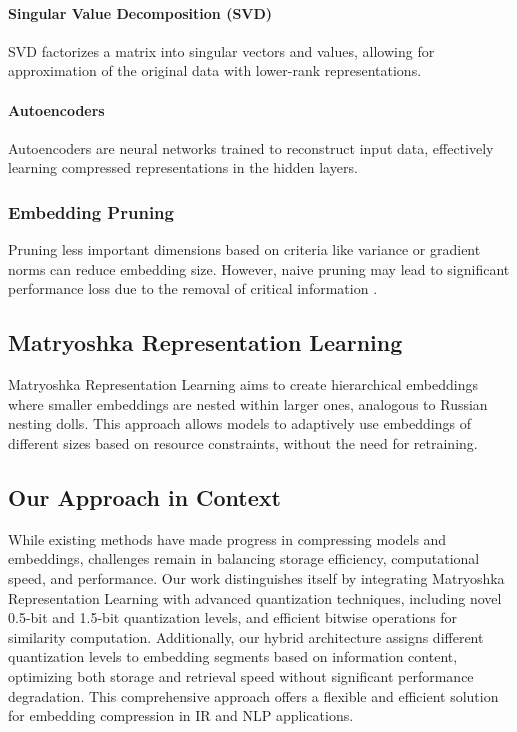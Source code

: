 \paragraph{Singular Value Decomposition (SVD)}  
  
SVD \cite{golub1971singular} factorizes a matrix into singular vectors and values, allowing for approximation of the original data with lower-rank representations.  
  
\paragraph{Autoencoders}  
  
Autoencoders \cite{hinton2006reducing} are neural networks trained to reconstruct input data, effectively learning compressed representations in the hidden layers.  
  
\subsubsection{Embedding Pruning}  
  
Pruning less important dimensions based on criteria like variance or gradient norms can reduce embedding size. However, naive pruning may lead to significant performance loss due to the removal of critical information \cite{li2016pruning}.  
  
\subsection{Matryoshka Representation Learning}  
  
Matryoshka Representation Learning \cite{kusupati2021matryoshka} aims to create hierarchical embeddings where smaller embeddings are nested within larger ones, analogous to Russian nesting dolls. This approach allows models to adaptively use embeddings of different sizes based on resource constraints, without the need for retraining.  

  
\subsection{Our Approach in Context}  
  
While existing methods have made progress in compressing models and embeddings, challenges remain in balancing storage efficiency, computational speed, and performance. Our work distinguishes itself by integrating Matryoshka Representation Learning with advanced quantization techniques, including novel 0.5-bit and 1.5-bit quantization levels, and efficient bitwise operations for similarity computation. Additionally, our hybrid architecture assigns different quantization levels to embedding segments based on information content, optimizing both storage and retrieval speed without significant performance degradation. This comprehensive approach offers a flexible and efficient solution for embedding compression in IR and NLP applications.  


